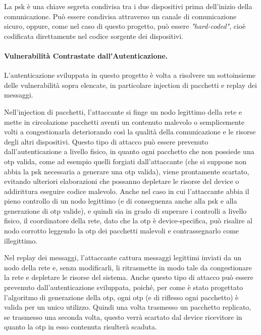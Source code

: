 La \gls{psk} è una chiave segreta condivisa tra i due dispositivi prima dell'inizio della comunicazione. Può essere condivisa attraverso un canale di comunicazione sicuro, oppure, come nel caso di questo progetto, può essere \textit{"hard-coded"}, cioè codificata direttamente nel codice sorgente dei dispositivi.


\paragraph{Vulnerabilità Contrastate dall'Autenticazione.}

L'autenticazione sviluppata in questo progetto è volta a risolvere un sottoinsieme delle vulnerabilità sopra elencate, in particolare injection di pacchetti e replay dei messaggi.

Nell'injection di pacchetti, l'attaccante si finge un nodo legittimo della rete e mette in circolazione pacchetti aventi un contenuto malevolo o semplicemente volti a congestionarla deteriorando così la qualità della comunicazione e le risorse degli altri dispositivi. Questo tipo di attacco può essere prevenuto dall'autenticazione a livello fisico, in quanto ogni pacchetto che non possiede una \gls{otp} valida, come ad esempio quelli forgiati dall'attaccante (che si suppone non abbia la \gls{psk} necessaria a generare una \gls{otp} valida), viene prontamente scartato, evitando ulteriori elaborazioni che possanno depletare le risorse del device o addirittura eseguire codice malevolo. Anche nel caso in cui l'attaccante abbia il pieno controllo di un nodo legittimo (e di conseguenza anche alla \gls{psk} e alla generazione di \gls{otp} valide), e quindi sia in grado di superare i controlli a livello fisico, il coordinatore della rete, dato che la \gls{otp} è device-specifica, può risalire al nodo corrotto leggendo la \gls{otp} dei pacchetti malevoli e contrassegnarlo come illegittimo.

Nel replay dei messaggi, l'attaccante cattura messaggi legittimi inviati da un nodo della rete e, senza modificarli, li ritrasmette in modo tale da congestionare la rete e depletare le risorse del sistema. Anche questo tipo di attacco può essere prevenuto dall'autenticazione sviluppata, poiché, per come è stato progettato l'algoritmo di generazione della \gls{otp}, ogni \gls{otp} (e di riflesso ogni pacchetto) è valida per un unico utilizzo. Quindi una volta trasmesso un pacchetto replicato, se trasmesso una seconda volta, questo verrà scartato dal device ricevitore in quanto la \gls{otp} in esso contenuta risulterà scaduta.



